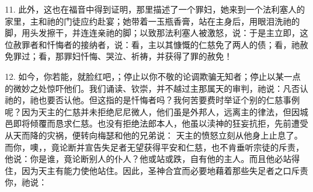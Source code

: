 11. 此外，这也在福音中得到证明，那里描述了一个罪妇，她来到一个法利塞人的家里，主和祂的门徒应约赴宴；她带着一玉瓶香膏，站在主身后，用眼泪洗祂的脚，用头发擦干，并连连亲祂的脚；以致那法利塞人被激怒，说：于是主立即，这位赦罪者和忏悔者的接纳者，说：看，主以其慷慨的仁慈免了两人的债；看，祂赦免罪过；看，那罪妇忏悔、哭泣、祈祷，并获得了罪的赦免！\par

12. 如今，你若能，就脸红吧，；停止以你不敬的论调欺骗无知者；停止以某一点的微妙之处惊吓他们。我们诵读、钦崇，并不越过主那属天的审判，祂说：凡否认祂的，祂也要否认他。但这指的是忏悔者吗？我何苦要费时举证个别的仁慈事例呢？因为天主的仁慈并未拒绝尼尼微人，他们虽是外邦人，远离主的律法，但因城邑即将倾覆而恳求仁慈。也没有拒绝法郎本人，他虽以渎神的狂妄抗拒，先前遭受从天而降的灾祸，便转向梅瑟和他的兄弟说： 天主的愤怒立刻从他身上止息了。而你，噢，，竟论断并宣告失足者无望获得平安和仁慈，也不肯垂听宗徒的斥责，他说：你是谁，竟论断别人的仆人？他或站或跌，自有他的主人。而且他必站得住，因为天主有能力使他站住。因此，圣神合宜而必要地藉着那些失足者之口斥责你，祂说： \par

